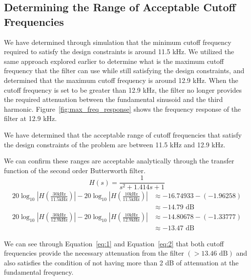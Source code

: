 \documentclass[12pt]{article}
\begin{document}
\subsection*{Determining the Range of Acceptable Cutoff Frequencies}
We have determined through simulation that the minimum cutoff frequency required to satisfy the design constraints is around 11.5 kHz. We utilized the same approach explored earlier to determine what is the maximum cutoff frequency that the filter can use while still satisfying the design constraints, and determined that the maximum cutoff frequency is around 12.9 kHz. When the cutoff frequency is set to be greater than 12.9 kHz, the filter no longer provides the required attenuation between the fundamental sinusoid and the third harmonic. Figure~\ref{fig:max_freq_response} shows the frequency response of the filter at 12.9 kHz.

We have determined that the acceptable range of cutoff frequencies that satisfy the design constraints of the problem are between 11.5 kHz and 12.9 kHz.

We can confirm these ranges are acceptable analytically through the transfer function of the second order Butterworth filter.
\begin{equation*}
    H(s) = \frac{1}{s^2 + 1.414s + 1}
\end{equation*}
\begin{equation} \label{eq:1}
\begin{aligned}
    20\log_{10}{\left|H\left(\frac{30 \text{kHz}}{11.5 \text{kHz}}\right)\right|} - 20\log_{10}{\left|H\left(\frac{10 \text{kHz}}{11.5 \text{kHz}}\right)\right|} &\approx -16.74933 - (-1.96258) \\
    &\approx -14.79 \text{ dB}
\end{aligned}
\end{equation}
\begin{equation} \label{eq:2}
\begin{aligned}
    20\log_{10}{\left|H\left(\frac{30 \text{kHz}}{12.9 \text{kHz}}\right)\right|} - 20\log_{10}{\left|H\left(\frac{10 \text{kHz}}{12.9 \text{kHz}}\right)\right|} &\approx -14.80678 - (-1.33777) \\
    &\approx -13.47 \text{ dB}
\end{aligned}
\end{equation}

We can see through Equation~\ref{eq:1} and Equation~\ref{eq:2} that both cutoff frequencies provide the necessary attenuation from the filter $(> 13.46 \text{ dB})$ and also satisfies the condition of not having more than 2 dB of attenuation at the fundamental frequency.
\end{document}
